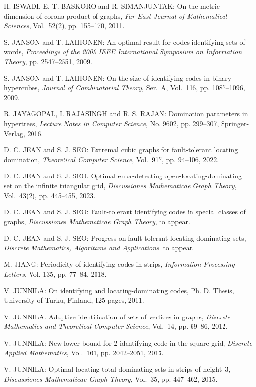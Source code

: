 \begin{thebibliography}{999}
H. ISWADI, E. T. BASKORO and R. SIMANJUNTAK: On the metric dimension of corona product of graphs, {\it Far East Journal of Mathematical Sciences}, Vol.~52(2), pp. 155--170, 2011.   

S. JANSON and T. LAIHONEN: An optimal result for codes identifying sets of words, {\it Proceedings of the 2009 IEEE International Symposium on Information Theory}, pp. 2547--2551, 2009.

S. JANSON and T. LAIHONEN: On the size of identifying codes in binary hypercubes, {\it Journal of Combinatorial Theory}, Ser.~A, Vol.~116, pp. 1087--1096, 2009.

R. JAYAGOPAL, I. RAJASINGH and R. S. RAJAN: Domination parameters in hypertrees, {\it Lecture Notes in Computer Science}, No. 9602, pp. 299--307, Springer-Verlag, 2016.

D. C. JEAN and S. J. SEO: Extremal cubic graphs for fault-tolerant locating domination, {\it Theoretical Computer Science}, Vol.~917, pp. 94--106, 2022.

D. C. JEAN and S. J. SEO: Optimal error-detecting open-locating-dominating set on the infinite triangular grid, {\it Discussiones Mathematicae Graph Theory}, Vol.~43(2), pp. 445--455, 2023. 

D. C. JEAN and S. J. SEO: Fault-tolerant identifying codes in special classes of graphs, {\it Discussiones Mathematicae Graph Theory}, to appear.

D. C. JEAN and S. J. SEO: Progress on fault-tolerant locating-dominating sets, {\it Discrete Mathematics, Algorithms and Applications}, to appear.

M. JIANG: Periodicity of identifying codes in strips, {\it Information Processing Letters}, Vol. 135, pp. 77--84, 2018. 

V. JUNNILA: On identifying and locating-dominating codes, Ph. D. Thesis, University of Turku, Finland, 125 pages, 2011.

V. JUNNILA: Adaptive identification of sets of vertices in graphs, {\it Discrete Mathematics and Theoretical Computer Science}, Vol.~14, pp. 69--86, 2012.

V. JUNNILA: New lower bound for 2-identifying code in the square grid, {\it Discrete Applied Mathematics}, Vol.~161, pp. 2042--2051, 2013.

V. JUNNILA: Optimal locating-total dominating sets in strips of height~3, {\it Discussiones Mathematicae Graph Theory}, Vol.~35, pp. 447--462, 2015. 


\end{thebibliography}
